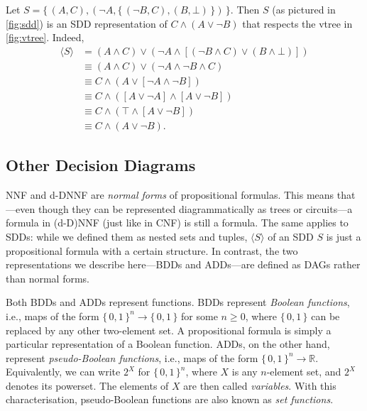 \begin{example}
  Let $S = \{\, (A, C), (\neg A, \{\, (\neg B, C), (B, \bot) \,\}) \,\}$. Then
  $S$ (as pictured in \cref{fig:sdd}) is an SDD representation of
  $C \land (A \lor \neg B)$ that respects the vtree in \cref{fig:vtree}. Indeed,
  \begin{align*}
    \langle S \rangle &= (A \land C) \lor (\neg A \land [(\neg B \land C) \lor (B \land \bot)]) \\
    &\equiv (A \land C) \lor (\neg A \land \neg B \land C) \\
    &\equiv C \land (A \lor [\neg A \land \neg B]) \\
    &\equiv C \land ([A \lor \neg A] \land [A \lor \neg B]) \\
    &\equiv C \land (\top \land [A \lor \neg B]) \\
    &\equiv C \land (A \lor \neg B).
  \end{align*}
\end{example}

\subsection{Other Decision Diagrams}\label{sec:dds}

NNF and d-DNNF are \emph{normal forms} of propositional formulas. This means
that---even though they can be represented diagrammatically as trees or
circuits---a formula in (d-D)NNF (just like in CNF) is still a formula. The same
applies to SDDs: while we defined them as nested sets and tuples,
$\langle S \rangle$ of an SDD $S$ is just a propositional formula with a certain
structure. In contrast, the two representations we describe here---BDDs and
ADDs---are defined as DAGs rather than normal forms.

Both BDDs and ADDs represent functions. BDDs represent \emph{Boolean functions},
i.e., maps of the form ${\{\, 0, 1 \,\}}^n \to \{\, 0, 1 \,\}$ for some
$n \ge 0$, where $\{\, 0, 1 \,\}$ can be replaced by any other two-element set.
A propositional formula is simply a particular representation of a Boolean
function. ADDs, on the other hand, represent \emph{pseudo-Boolean functions},
i.e., maps of the form ${\{\, 0, 1 \,\}}^n \to \mathbb{R}$. Equivalently, we can
write $2^X$ for ${\{\, 0, 1 \,\}}^n$, where $X$ is any $n$-element set, and
$2^X$ denotes its powerset. The elements of $X$ are then called
\emph{variables}. With this characterisation, pseudo-Boolean functions are also
known as \emph{set functions}.

